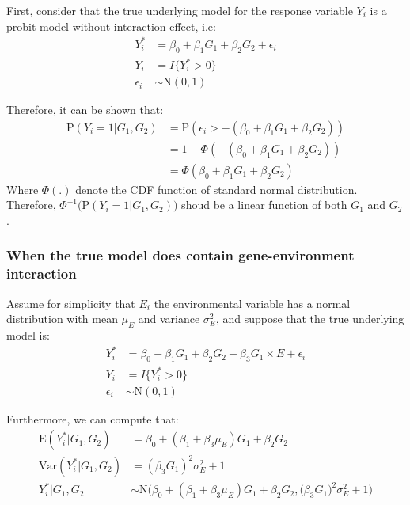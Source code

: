 \documentclass[]{article}
\begin{document}
First, consider that the true underlying model for the response variable
\(Y_i\) is a probit model without interaction effect, i.e:
\begin{equation}\label{eqn:probitModel}
\begin{aligned}
Y_i^* &= \beta_0 + \beta_1 G_1 + \beta_2 G_2 + \epsilon_i \\
Y_i &= I\{Y_i^*>0\} \\
\epsilon_i &\sim \text{N}(0,1)
\end{aligned}
\end{equation}

Therefore, it can be shown that:
\begin{equation}\label{eqn:probitModelLinearity}
\begin{aligned}
\text{P}(Y_i = 1| G_1, G_2) &= \text{P}(\epsilon_i > -(\beta_0 +\beta_1 G_1 + \beta_2 G_2)) \\
&= 1 - \Phi(-(\beta_0 + \beta_1 G_1 + \beta_2 G_2)) \\
&= \Phi(\beta_0 + \beta_1 G_1 + \beta_2 G_2)
\end{aligned}
\end{equation} Where \(\Phi(.)\) denote the CDF function of standard
normal distribution. Therefore,
\(\Phi^{-1}\bigg(\text{P}(Y_i = 1|G_1,G_2)\bigg)\) shoud be a linear
function of both \(G_1\) and \(G_2\).

\hypertarget{when-the-true-model-does-contain-gene-environment-interaction}{%
\subsubsection{When the true model does contain gene-environment
interaction}\label{when-the-true-model-does-contain-gene-environment-interaction}}

Assume for simplicity that \(E_i\) the environmental variable has a
normal distribution with mean \(\mu_E\) and variance \(\sigma_E^2\), and
suppose that the true underlying model is:
\begin{equation}\label{eqn:probitModelWithInteraction}
\begin{aligned}
Y_i^* &= \beta_0 + \beta_1 G_1 + \beta_2 G_2 + \beta_3 G_1 \times E + \epsilon_i \\
Y_i &= I\{Y_i^*>0\} \\
\epsilon_i &\sim \text{N}(0,1)
\end{aligned}
\end{equation}

Furthermore, we can compute that:
\begin{equation}\label{eqn:probitModelWithInteraction_MeanVar}
\begin{aligned}
\text{E}(Y_i^*|G_1,G_2) &= \beta_0 + (\beta_1 + \beta_3 \mu_E)G_1 + \beta_2 G_2 \\
\text{Var}(Y_i^*|G_1,G_2) &= (\beta_3 G_1)^2 \sigma_E^2 + 1 \\
Y_i^*|G_1, G_2 &\sim \text{N}\bigg(\beta_0 + (\beta_1 + \beta_3 \mu_E)G_1 + \beta_2 G_2,  \big(\beta_3 G_1\big)^2 \sigma_E^2 + 1\bigg)
\end{aligned}
\end{equation}
\end{document}

